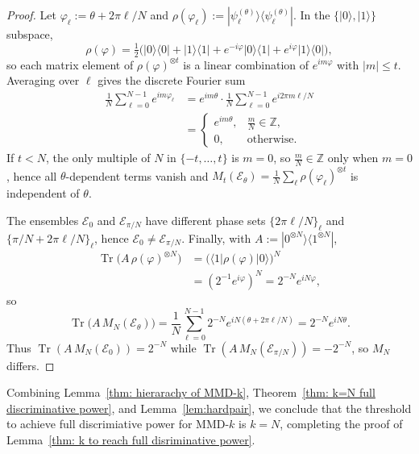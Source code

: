 \documentclass[aps,prx,reprint,superscriptaddress,amsmath,amssymb,longbibliography,floatfix]{revtex4-2}
\providecommand{\bra}[1]{\langle #1|}
\providecommand{\ket}[1]{|#1 \rangle}
\providecommand{\ketbra}[2]{|#1\rangle \langle #2|}
\newcommand{\dsZ}{\mathbb{Z}}
\newcommand{\Tr}{\operatorname{Tr}}
\theoremstyle{plain}
\theoremstyle{definition}
\theoremstyle{remark}
\begin{document}
\begin{proof}
Let $\varphi_\ell:=\theta+2\pi\ell/N$ and $\rho(\varphi_\ell):=\ketbra{\psi_\ell^{(\theta)}}{\psi_\ell^{(\theta)}}$.
In the $\{\ket{0},\ket{1}\}$ subspace,
\[
\rho(\varphi)=\tfrac12\big(\ketbra{0}{0}+\ketbra{1}{1}+e^{-i\varphi}\ketbra{0}{1}+e^{i\varphi}\ketbra{1}{0}\big),
\]
so each matrix element of $\rho(\varphi)^{\otimes t}$ is a linear combination of $e^{im\varphi}$ with $|m|\le t$.
Averaging over $\ell$ gives the discrete Fourier sum
\begin{equation}
\begin{aligned}
\frac1N\sum_{\ell=0}^{N-1}e^{im\varphi_\ell}
&=e^{im\theta}\cdot \frac1N\sum_{\ell=0}^{N-1}e^{i2\pi m\ell/N}\\
&=
\begin{cases}
e^{im\theta}, & \frac{m}{N}\in\dsZ,\\
0, & \text{otherwise}.
\end{cases}
\end{aligned}
\label{eq:app-discrete-phase-fourier-sum}
\end{equation}
If $t<N$, the only multiple of $N$ in $\{-t,\dots,t\}$ is $m=0$, so $\frac{m}{N}\in\dsZ$ only when $m=0$, hence all $\theta$-dependent terms vanish and
$M_t(\mathcal E_\theta)=\frac1N\sum_{\ell}\rho(\varphi_\ell)^{\otimes t}$ is independent of $\theta$.

The ensembles $\mathcal E_0$ and $\mathcal E_{\pi/N}$ have different phase sets
$\{2\pi\ell/N\}_\ell$ and $\{\pi/N+2\pi\ell/N\}_\ell$, hence $\mathcal E_0\neq \mathcal E_{\pi/N}$.
Finally, with $A:=\ketbra{0^{\otimes N}}{1^{\otimes N}}$,
\[
\begin{aligned}
\Tr\!\big(A\,\rho(\varphi)^{\otimes N}\big)&=\big(\bra{1}\rho(\varphi)\ket{0}\big)^N\\
&=(2^{-1}e^{i\varphi})^N=2^{-N}e^{iN\varphi},
\end{aligned}
\]
so
\begin{equation}
\Tr\!\big(A\,M_N(\mathcal E_\theta)\big)=\frac1N\sum_{\ell=0}^{N-1}2^{-N}e^{iN(\theta+2\pi\ell/N)}=2^{-N}e^{iN\theta}.
\label{eq:app-phase-polygon-nth-moment}
\end{equation}
Thus $\Tr(A\,M_N(\mathcal E_0))=2^{-N}$ while $\Tr(A\,M_N(\mathcal E_{\pi/N}))=-2^{-N}$, so $M_N$ differs.
\end{proof}
Combining Lemma~\ref{thm: hierarachy of MMD-k}, Theorem~\ref{thm: k=N full discriminative power}, and Lemma~\ref{lem:hardpair}, we conclude that the threshold to achieve full discrimiative power for MMD-$k$ is $k=N$, completing the proof of Lemma~\ref{thm: k to reach full disriminative power}.
\end{document}
